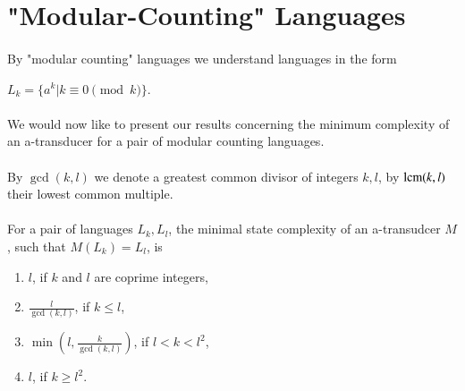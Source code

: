 \section{"Modular-Counting" Languages}

\paragraph{}
By "modular counting" languages we understand languages in the form \\
\centerline{$L_k = \{ a^k | k \equiv 0 \pmod{k} \} $.}

\paragraph{}
We would now like to present our results concerning the minimum complexity of an a-transducer for a pair of modular counting languages.

\paragraph{}
\oznacenie By $\gcd(k,l)$ we denote a greatest common divisor of integers $k,l$, by $\operatorname{lcm}(k,l)$ their lowest common multiple.

\paragraph{}
\clema For a pair of languages $L_k, L_l$, the minimal state complexity of an a-transudcer $M$, such that $M(L_k) = L_l$, is 
\begin{enumerate}
\item $l$, if $k$ and $l$ are coprime integers,
\item $\frac{l}{\gcd(k,l)}$, if $k \leq l$,
\item $\min(l,\frac{k}{\gcd(k,l)})$, if $l < k < l^2$,
\item $l$, if $k \geq l^2$.
\end{enumerate}

